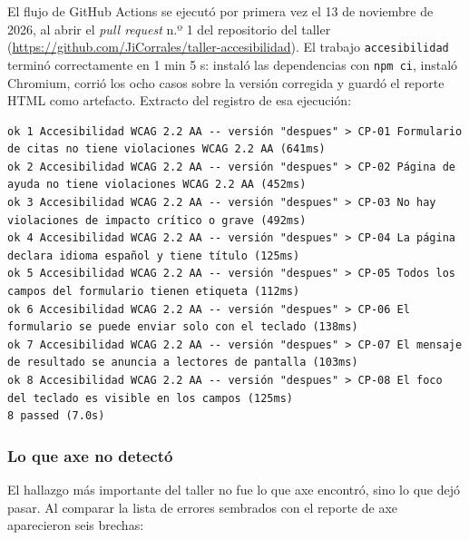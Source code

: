 \documentclass[10pt,letterpaper,onecolumn]{IEEEtran}
\begin{document}
El flujo de GitHub Actions se ejecutó por primera vez el 13 de noviembre de 2026, al abrir el \emph{pull request} n.º 1 del repositorio del taller (\url{https://github.com/JiCorrales/taller-accesibilidad}). El trabajo \texttt{accesibilidad} terminó correctamente en 1 min 5 s: instaló las dependencias con \texttt{npm ci}, instaló Chromium, corrió los ocho casos sobre la versión corregida y guardó el reporte HTML como artefacto. Extracto del registro de esa ejecución:

\begin{lstlisting}
ok 1 Accesibilidad WCAG 2.2 AA -- versión "despues" > CP-01 Formulario de citas no tiene violaciones WCAG 2.2 AA (641ms)
ok 2 Accesibilidad WCAG 2.2 AA -- versión "despues" > CP-02 Página de ayuda no tiene violaciones WCAG 2.2 AA (452ms)
ok 3 Accesibilidad WCAG 2.2 AA -- versión "despues" > CP-03 No hay violaciones de impacto crítico o grave (492ms)
ok 4 Accesibilidad WCAG 2.2 AA -- versión "despues" > CP-04 La página declara idioma español y tiene título (125ms)
ok 5 Accesibilidad WCAG 2.2 AA -- versión "despues" > CP-05 Todos los campos del formulario tienen etiqueta (112ms)
ok 6 Accesibilidad WCAG 2.2 AA -- versión "despues" > CP-06 El formulario se puede enviar solo con el teclado (138ms)
ok 7 Accesibilidad WCAG 2.2 AA -- versión "despues" > CP-07 El mensaje de resultado se anuncia a lectores de pantalla (103ms)
ok 8 Accesibilidad WCAG 2.2 AA -- versión "despues" > CP-08 El foco del teclado es visible en los campos (125ms)
8 passed (7.0s)
\end{lstlisting}

\subsubsection{Lo que axe no detectó}\label{lo-que-axe-no-detectuxf3}

El hallazgo más importante del taller no fue lo que axe encontró, sino lo que dejó pasar. Al comparar la lista de errores sembrados con el reporte de axe aparecieron seis brechas:
\end{document}

